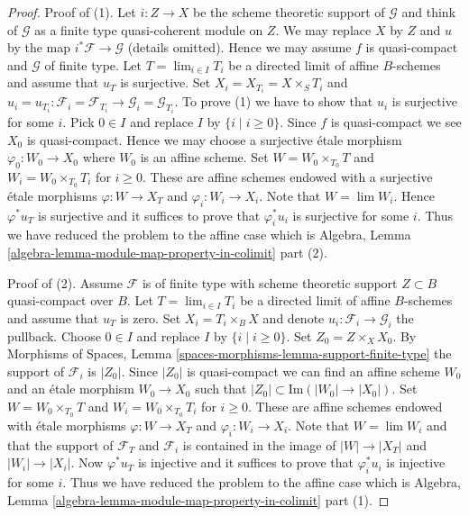\begin{proof}
Proof of (1). Let $i : Z \to X$ be the scheme theoretic support of
$\mathcal{G}$ and think of $\mathcal{G}$ as a finite type quasi-coherent
module on $Z$. We may replace $X$ by $Z$ and $u$ by the map
$i^*\mathcal{F} \to \mathcal{G}$ (details omitted). Hence we may assume
$f$ is quasi-compact and $\mathcal{G}$ of finite type.
Let $T = \lim_{i \in I} T_i$ be a directed limit of affine $B$-schemes
and assume that $u_T$ is surjective.
Set $X_i = X_{T_i} = X \times_S T_i$ and
$u_i = u_{T_i} : \mathcal{F}_i = \mathcal{F}_{T_i}
\to \mathcal{G}_i = \mathcal{G}_{T_i}$.
To prove (1) we have to show that $u_i$ is surjective for some $i$.
Pick $0 \in I$ and replace $I$ by $\{i \mid i \geq 0\}$.
Since $f$ is quasi-compact we see $X_0$ is quasi-compact.
Hence we may choose a surjective \'etale morphism $\varphi_0 : W_0 \to X_0$
where $W_0$ is an affine scheme. Set $W = W_0 \times_{T_0} T$
and $W_i = W_0 \times_{T_0} T_i$ for $i \geq 0$.  These
are affine schemes endowed
with a surjective \'etale morphisms $\varphi : W \to X_T$ and
$\varphi_i : W_i \to X_i$. Note that $W = \lim W_i$.
Hence $\varphi^*u_T$ is surjective and it suffices to prove that
$\varphi_i^*u_i$ is surjective for some $i$. Thus we have reduced
the problem to the affine case which is
Algebra, Lemma \ref{algebra-lemma-module-map-property-in-colimit} part (2).

\medskip\noindent
Proof of (2). Assume $\mathcal{F}$ is of finite type with scheme theoretic
support $Z \subset B$ quasi-compact over $B$. Let $T = \lim_{i \in I} T_i$
be a directed limit of affine $B$-schemes and assume that $u_T$ is zero.
Set $X_i = T_i \times_B X$ and denote $u_i : \mathcal{F}_i \to \mathcal{G}_i$
the pullback. Choose $0 \in I$ and replace $I$ by
$\{i \mid i \geq 0\}$. Set $Z_0 = Z \times_X X_0$. By
Morphisms of Spaces, Lemma \ref{spaces-morphisms-lemma-support-finite-type}
the support of $\mathcal{F}_i$ is $|Z_0|$. Since $|Z_0|$ is quasi-compact
we can find an affine scheme $W_0$ and an \'etale morphism $W_0 \to X_0$
such that $|Z_0| \subset \text{Im}(|W_0| \to |X_0|)$.
Set $W = W_0 \times_{T_0} T$ and $W_i = W_0 \times_{T_0} T_i$ for $i \geq 0$.
These are affine schemes endowed
with \'etale morphisms $\varphi : W \to X_T$ and
$\varphi_i : W_i \to X_i$. Note that $W = \lim W_i$
and that the support of $\mathcal{F}_T$ and $\mathcal{F}_i$
is contained in the image of $|W| \to |X_T|$ and $|W_i| \to |X_i|$.
Now $\varphi^*u_T$ is injective and it suffices to prove that
$\varphi_i^*u_i$ is injective for some $i$.
Thus we have reduced the problem to the affine case which is
Algebra, Lemma \ref{algebra-lemma-module-map-property-in-colimit} part (1).


\end{proof}
